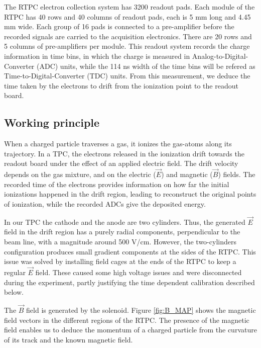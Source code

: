 The RTPC electron collection system has 3200 readout pads. Each module of the 
RTPC has 40 rows and 40 columns of readout pads, each is 5 mm long and 4.45 mm 
wide. Each group of 16 pads is connected to a pre-amplifier before the recorded 
signals are carried to the acquisition electronics. There are 20 rows and 5 
columns of pre-amplifiers per module. This readout system records the charge 
information in time bins, in which the charge is measured in 
Analog-to-Digital-Converter (ADC) units, while the 114 ns width of the time bins 
will be refered as Time-to-Digital-Converter (TDC) units.  
From this measurement, we deduce the time taken by the electrons to drift from the 
ionization point to the readout board.

 
\subsection{Working principle}
When a charged particle traverses a gas, it ionizes the gas-atoms along its 
trajectory. In a TPC, the electrons released in the ionization drift towards 
the readout board under the effect of an applied electric field. The drift 
velocity depends on the gas mixture, and on the electric ($\vec{E}$) and 
magnetic ($\vec{B}$) fields. The recorded time of the electrons provides 
information on how far the initial ionizations happened in the drift region, 
leading to reconstruct the original points of ionization, while the recorded 
ADCs give the deposited energy.

In our TPC the cathode and the anode are two cylinders. Thus, the generated 
$\vec{E}$ field in the drift region has a purely radial components, 
perpendicular to the beam line, with a magnitude around 500 V/cm. However, the 
two-cylinders configuration produces small gradient components at the sides of 
the RTPC. This issue was solved by installing field cages at the ends of the 
RTPC to keep a regular $\vec{E}$ field. These caused some high voltage issues 
and were disconnected during the experiment, partly justifying the time 
dependent calibration described below. 

The $\vec{B}$ field is generated by the solenoid. Figure \ref{fig:B_MAP} shows 
the magnetic field vectors in the different regions of the RTPC. The presence 
of the magnetic field enables us to deduce the momentum of a charged particle 
from the curvature of its track and the known magnetic field.

